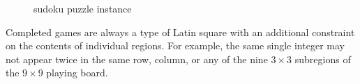 \documentclass{mcmthesis}
\begin{document}
\begin{figure}[htbp]
\centering %
\caption{sudoku puzzle instance} %
\label{fig:1.3.1} %
\end{figure}


\indent Completed games are always a type of Latin square with an additional constraint on the contents of individual regions. For example, the same single integer may not appear twice in the same row, column, or any of the nine $3\times3$ subregions of the $9\times9$ playing board.\newline
\end{document}
